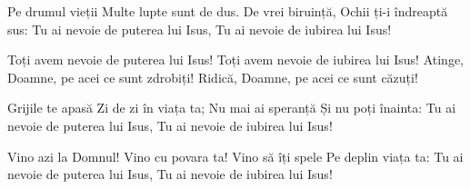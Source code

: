 \beginverse
Pe drumul vieții
Multe lupte sunt de dus.
De vrei biruință,
Ochii ți-i îndreaptă sus:
Tu ai nevoie de puterea lui Isus,
Tu ai nevoie de iubirea lui Isus!
\endverse

\beginchorus
Toți avem nevoie de puterea lui Isus!
Toți avem nevoie de iubirea lui Isus!
Atinge, Doamne, pe acei ce sunt zdrobiți!
Ridică, Doamne, pe acei ce sunt căzuți!
\endchorus

\beginverse
Grijile te apasă
Zi de zi în viața ta;
Nu mai ai speranță
Și nu poți înainta:
Tu ai nevoie de puterea lui Isus,
Tu ai nevoie de iubirea lui Isus!
\endverse

\beginverse
Vino azi la Domnul!
Vino cu povara ta!
Vino să îți spele
Pe deplin viața ta:
Tu ai nevoie de puterea lui Isus,
Tu ai nevoie de iubirea lui Isus!
\endverse
\endsong